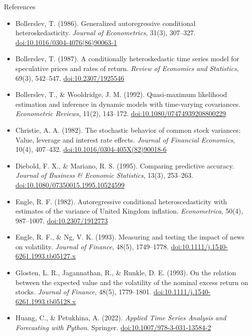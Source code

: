 \begin{frame}{References}
\itemsize{\tiny}
\begin{itemize}
    \item Bollerslev, T. (1986). Generalized autoregressive conditional heteroskedasticity. \textit{Journal of Econometrics}, 31(3), 307--327. \href{https://doi.org/10.1016/0304-4076(86)90063-1}{doi:10.1016/0304-4076(86)90063-1}
    \item Bollerslev, T. (1987). A conditionally heteroskedastic time series model for speculative prices and rates of return. \textit{Review of Economics and Statistics}, 69(3), 542--547. \href{https://doi.org/10.2307/1925546}{doi:10.2307/1925546}
    \item Bollerslev, T., \& Wooldridge, J. M. (1992). Quasi-maximum likelihood estimation and inference in dynamic models with time-varying covariances. \textit{Econometric Reviews}, 11(2), 143--172. \href{https://doi.org/10.1080/07474939208800229}{doi:10.1080/07474939208800229}
    \item Christie, A. A. (1982). The stochastic behavior of common stock variances: Value, leverage and interest rate effects. \textit{Journal of Financial Economics}, 10(4), 407--432. \href{https://doi.org/10.1016/0304-405X(82)90018-6}{doi:10.1016/0304-405X(82)90018-6}
    \item Diebold, F. X., \& Mariano, R. S. (1995). Comparing predictive accuracy. \textit{Journal of Business \& Economic Statistics}, 13(3), 253--263. \href{https://doi.org/10.1080/07350015.1995.10524599}{doi:10.1080/07350015.1995.10524599}
    \item Engle, R. F. (1982). Autoregressive conditional heteroscedasticity with estimates of the variance of United Kingdom inflation. \textit{Econometrica}, 50(4), 987--1007. \href{https://doi.org/10.2307/1912773}{doi:10.2307/1912773}
    \item Engle, R. F., \& Ng, V. K. (1993). Measuring and testing the impact of news on volatility. \textit{Journal of Finance}, 48(5), 1749--1778. \href{https://doi.org/10.1111/j.1540-6261.1993.tb05127.x}{doi:10.1111/j.1540-6261.1993.tb05127.x}
    \item Glosten, L. R., Jagannathan, R., \& Runkle, D. E. (1993). On the relation between the expected value and the volatility of the nominal excess return on stocks. \textit{Journal of Finance}, 48(5), 1779--1801. \href{https://doi.org/10.1111/j.1540-6261.1993.tb05128.x}{doi:10.1111/j.1540-6261.1993.tb05128.x}
    \item Huang, C., \& Petukhina, A. (2022). \textit{Applied Time Series Analysis and Forecasting with Python}. Springer. \href{https://doi.org/10.1007/978-3-031-13584-2}{doi:10.1007/978-3-031-13584-2}

\end{itemize}
\end{frame}
